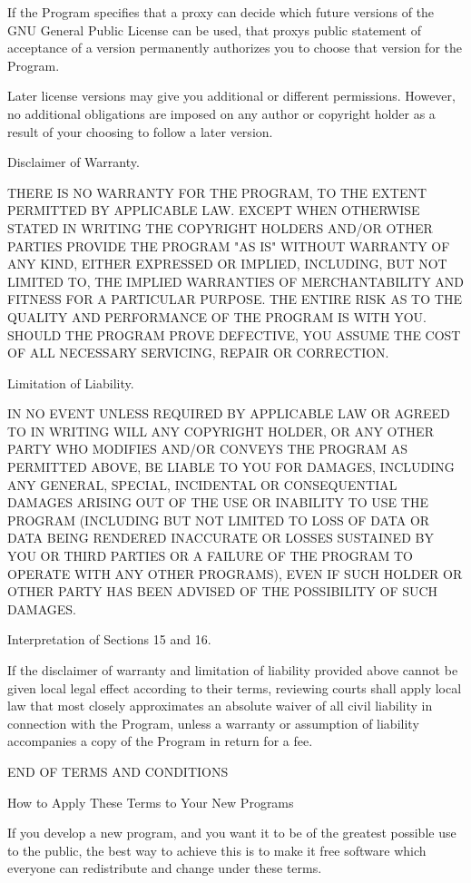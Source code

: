 If the Program specifies that a proxy can decide which future versions of the GNU General Public License can be used, that proxy\textquotesingle{}s public statement of acceptance of a version permanently authorizes you to choose that version for the Program.

Later license versions may give you additional or different permissions. However, no additional obligations are imposed on any author or copyright holder as a result of your choosing to follow a later version.


\begin{DoxyEnumerate}
\item Disclaimer of Warranty.
\end{DoxyEnumerate}

THERE IS NO WARRANTY FOR THE PROGRAM, TO THE EXTENT PERMITTED BY APPLICABLE LAW. EXCEPT WHEN OTHERWISE STATED IN WRITING THE COPYRIGHT HOLDERS AND/\+OR OTHER PARTIES PROVIDE THE PROGRAM "{}\+AS IS"{} WITHOUT WARRANTY OF ANY KIND, EITHER EXPRESSED OR IMPLIED, INCLUDING, BUT NOT LIMITED TO, THE IMPLIED WARRANTIES OF MERCHANTABILITY AND FITNESS FOR A PARTICULAR PURPOSE. THE ENTIRE RISK AS TO THE QUALITY AND PERFORMANCE OF THE PROGRAM IS WITH YOU. SHOULD THE PROGRAM PROVE DEFECTIVE, YOU ASSUME THE COST OF ALL NECESSARY SERVICING, REPAIR OR CORRECTION.


\begin{DoxyEnumerate}
\item Limitation of Liability.
\end{DoxyEnumerate}

IN NO EVENT UNLESS REQUIRED BY APPLICABLE LAW OR AGREED TO IN WRITING WILL ANY COPYRIGHT HOLDER, OR ANY OTHER PARTY WHO MODIFIES AND/\+OR CONVEYS THE PROGRAM AS PERMITTED ABOVE, BE LIABLE TO YOU FOR DAMAGES, INCLUDING ANY GENERAL, SPECIAL, INCIDENTAL OR CONSEQUENTIAL DAMAGES ARISING OUT OF THE USE OR INABILITY TO USE THE PROGRAM (INCLUDING BUT NOT LIMITED TO LOSS OF DATA OR DATA BEING RENDERED INACCURATE OR LOSSES SUSTAINED BY YOU OR THIRD PARTIES OR A FAILURE OF THE PROGRAM TO OPERATE WITH ANY OTHER PROGRAMS), EVEN IF SUCH HOLDER OR OTHER PARTY HAS BEEN ADVISED OF THE POSSIBILITY OF SUCH DAMAGES.


\begin{DoxyEnumerate}
\item Interpretation of Sections 15 and 16.
\end{DoxyEnumerate}

If the disclaimer of warranty and limitation of liability provided above cannot be given local legal effect according to their terms, reviewing courts shall apply local law that most closely approximates an absolute waiver of all civil liability in connection with the Program, unless a warranty or assumption of liability accompanies a copy of the Program in return for a fee. \begin{DoxyVerb}                 END OF TERMS AND CONDITIONS

        How to Apply These Terms to Your New Programs
\end{DoxyVerb}
 If you develop a new program, and you want it to be of the greatest possible use to the public, the best way to achieve this is to make it free software which everyone can redistribute and change under these terms.

